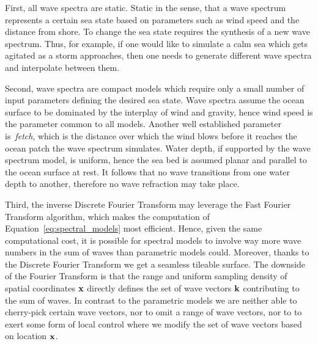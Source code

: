 First, all wave spectra
are static. Static in the sense, that a wave spectrum represents a certain sea
state based on parameters such as wind speed and the distance from shore. To
change the sea state requires the synthesis of a new wave spectrum. Thus, for
example, if one would like to simulate a calm sea which gets agitated as a storm
approaches, then one needs to generate different wave spectra and interpolate
between them.

Second, wave spectra are compact models which require only a small
number of input parameters defining the desired sea state. Wave spectra assume
the ocean surface to be dominated by the interplay of wind and gravity, hence
wind speed is the parameter common to all models. Another well established
parameter is~\emph{fetch}, which is the distance over which the wind blows
before it reaches the ocean patch the wave spectrum simulates. Water depth,
if supported by the wave spectrum model, is uniform, hence the sea bed is
assumed planar and parallel to the ocean surface at rest. It follows that no
wave transitions from one water depth to another, therefore no wave refraction
may take place.

Third, the inverse Discrete Fourier Transform may leverage the
Fast Fourier Transform algorithm, which makes the computation of
Equation~\ref{eq:spectral_models} most efficient. Hence, given the same
computational cost, it is possible for spectral models to involve way more wave
numbers in the sum of waves than parametric models could. Moreover, thanks to
the Discrete Fourier Transform we get a seamless tileable surface.
The downside of the Fourier Transform is that the range and uniform sampling
density of spatial coordinates $\mathbf{x}$ directly defines the set of wave
vectors $\mathbf{k}$ contributing to the sum of waves. In contrast to the
parametric models we are neither able to cherry-pick certain wave vectors,
nor to omit a range of wave vectors, nor to to exert some form of local control
where we modify the set of wave vectors based on location $\mathbf{x}$.\\

